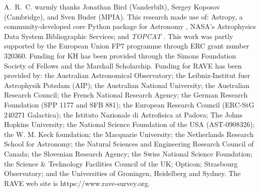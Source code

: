 \documentclass[preprint,trackchanges]{aastex}
\newcommand{\project}[1]{\textsl{#1}}
\begin{document}
\acknowledgements
A.~R.~C. warmly thanks Jonathan Bird (Vanderbilt), Sergey Koposov (Cambridge),
and Sven Buder (MPIA).
This research made use of: Astropy, a community-developed core Python package for
Astronomy \citep{astropy}, NASA's Astrophysics Data System Bibliographic Services;
and \project{TOPCAT} \citep{Taylor_2005}.
This work was partly supported by the European Union FP7 programme through ERC 
grant number 320360. Funding for KH has been provided through the Simons Foundation Society of Fellows and the Marshall Scholarship.
Funding for RAVE has been provided by: the Australian Astronomical Observatory; 
the Leibniz-Institut fuer Astrophysik Potsdam (AIP); the Australian National 
University; the Australian Research Council; the French National Research Agency;
the German Research Foundation (SPP 1177 and SFB 881); the European Research 
Council (ERC-StG 240271 Galactica); the Istituto Nazionale di Astrofisica at 
Padova; The Johns Hopkins University; the National Science Foundation of the USA
(AST-0908326); the W. M. Keck foundation; the Macquarie University; the 
Netherlands Research School for Astronomy; the Natural Sciences and Engineering 
Research Council of Canada; the Slovenian Research Agency; the Swiss National 
Science Foundation; the Science \& Technology Facilities Council of the UK; 
Opticon; Strasbourg Observatory; and the Universities of Groningen, Heidelberg 
and Sydney. The RAVE web site is https://www.rave-survey.org.  
\end{document}
